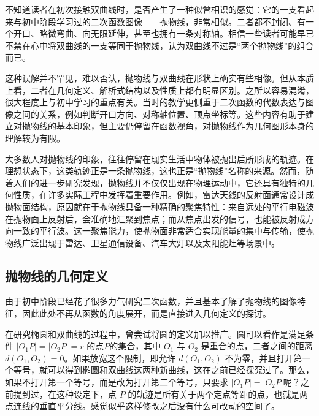 
\begin{issues}
\issueDraft
\end{issues}


不知道读者在初次接触双曲线时，是否产生了一种似曾相识的感觉：它的一支看起来与初中阶段学习过的二次函数图像——抛物线，非常相似。二者都不封闭、有一个开口、略微弯曲、向无限延伸，甚至也拥有一条对称轴。相信一些读者可能早已不禁在心中将双曲线的一支等同于抛物线，认为双曲线不过是“两个抛物线”的组合而已。

这种误解并不罕见，难以否认，抛物线与双曲线在形状上确实有些相像。但从本质上看，二者在几何定义、解析式结构以及性质上都有明显区别。之所以容易混淆，很大程度上与初中学习的重点有关。当时的教学更侧重于二次函数的代数表达与图像之间的关系，例如判断开口方向、对称轴位置、顶点坐标等。这些内容有助于建立对抛物线的基本印象，但主要仍停留在函数视角，对抛物线作为几何图形本身的理解较为有限。

大多数人对抛物线的印象，往往停留在现实生活中物体被抛出后所形成的轨迹。在理想状态下，这类轨迹正是一条抛物线，这也正是“抛物线”名称的来源。然而，随着人们的进一步研究发现，抛物线并不仅仅出现在物理运动中，它还具有独特的几何性质，在许多实际工程中发挥着重要作用。例如，雷达天线的反射面通常设计成抛物面结构，原因就在于抛物线具备一种精确的聚焦特性：来自远处的平行电磁波在抛物面上反射后，会准确地汇聚到焦点；而从焦点出发的信号，也能被反射成方向一致的平行波。这一聚焦能力，使抛物面非常适合实现能量的集中与传输，使抛物线广泛出现于雷达、卫星通信设备、汽车大灯以及太阳能灶等场景中。

\subsection{抛物线的几何定义}

由于初中阶段已经花了很多力气研究二次函数，并且基本了解了抛物线的图像特征，因此此处不再从函数的角度展开，而是直接进入几何定义的探讨。

在研究椭圆和双曲线的过程中，曾尝试将圆的定义加以推广。圆可以看作是满足条件 $|O_1P| = |O_2P| = r$ 的点$P$的集合，其中 $O_1$ 与 $O_2$ 是重合的点，二者之间的距离 $d(O_1,O_2)=0$。如果放宽这个限制，即允许 $d(O_1,O_2)$ 不为零，并且打开第一个等号，就可以得到椭圆和双曲线这两种新曲线，这在之前已经探究过了。那么，如果不打开第一个等号，而是改为打开第二个等号，只要求 $|O_1P| = |O_2P|$呢？之前提到过，在这种设定下，点 $P$ 的轨迹是所有关于两个定点等距的点，也就是两点连线的垂直平分线。感觉似乎这样修改之后没有什么可改动的空间了。

